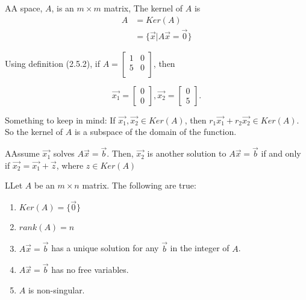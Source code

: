   \begin{definition}
    AA space, $A$, is an $m\times m$ matrix, The kernel of $A$ is 
    \begin{align}
      A&=Ker(A)\\
      &=\{\vec{x}|A\vec{x}=\vec{0}\}
    \end{align}
  \end{definition}

  Using definition (2.5.2), if $A=\left[\begin{smallmatrix}1&0\\5&0\\\end{smallmatrix}\right]$, then 

  \begin{equation}
    \vec{x_1}=
    \begin{bmatrix}
      0\\0
    \end{bmatrix}
    , 
    \vec{x_2}=
    \begin{bmatrix}
      0\\5
    \end{bmatrix}.
  \end{equation}

  Something to keep in mind: If $\vec{x_1},\vec{x_2}\in Ker(A)$, then $r_1\vec{x_1}+r_2\vec{x_2}\in Ker(A)$. So the kernel of $A$ is a subspace of the domain of the function.

  \begin{theorem}
    AAssume $\vec{x_1}$ solves $A\vec{x}=\vec{b}$. Then, $\vec{x_2}$ is another solution to $A\vec{x}=\vec{b}$ if and only if $\vec{x_2}=\vec{x_1}+\vec{z}$, where $z\in Ker(A)$
  \end{theorem}

  \begin{prop}
    LLet $A$ be an $m\times n$ matrix. The following are true:

    \begin{enumerate}
      \item $Ker(A)=\{\vec{0}\}$
      \item $rank(A)=n$
      \item $A\vec{x}=\vec{b}$ has a unique solution for any $\vec{b}$ in the integer of $A$.
      \item $A\vec{x}=\vec{b}$ has no free variables.
      \item $A$ is non-singular.
    \end{enumerate}
  \end{prop}

